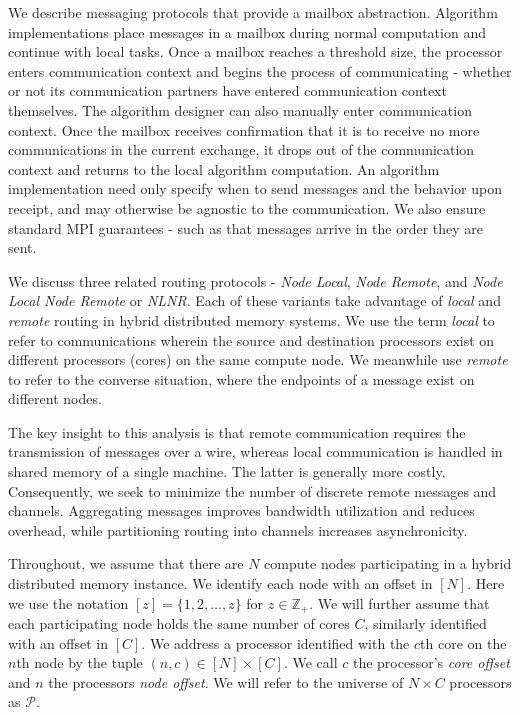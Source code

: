 \documentclass{report}
\begin{document}
We describe messaging protocols that provide a mailbox abstraction.
Algorithm implementations place messages in a mailbox during normal computation and continue with local tasks. 
Once a mailbox reaches a threshold size, the processor enters communication context and begins the process of communicating - whether or not its communication partners have entered communication context themselves. 
The algorithm designer can also manually enter communication context.
Once the mailbox receives confirmation that it is to receive no more communications in the current exchange, it drops out of the communication context and returns to the local algorithm computation.
An algorithm implementation need only specify when to send messages and the behavior upon receipt, and may otherwise be agnostic to the communication.
We also ensure standard MPI guarantees - such as that messages arrive in the order they are sent. 

We discuss three related routing protocols - \emph{Node Local}, \emph{Node Remote}, and \emph{Node Local Node Remote} or \emph{NLNR}.
Each of these variants take advantage of \emph{local} and \emph{remote} routing in hybrid distributed memory systems. 
We use the term \emph{local} to refer to communications wherein the source and destination processors exist on different processors (cores) on the same compute node.
We meanwhile use \emph{remote} to refer to the converse situation, where the endpoints of a message exist on different nodes. 

The key insight to this analysis is that remote communication requires the transmission of messages over a wire, whereas local communication is handled in shared memory of a single machine. 
The latter is generally more costly.
Consequently, we seek to minimize the number of discrete remote messages and channels.
Aggregating messages improves bandwidth utilization and reduces overhead, while  partitioning routing into channels increases asynchronicity. 

Throughout, we assume that there are $N$ compute nodes participating in a hybrid distributed memory instance.
We identify each node with an offset in $[N]$.
Here we use the notation $[z] = \{1, 2, \dots, z\}$ for $z \in \mathbb{Z}_+$.
We will further assume that each participating node holds the same number of cores $C$, similarly identified with an offset in $[C]$. 
We address a processor identified with the $c$th core on the $n$th node by the tuple $(n,c) \in [N] \times [C]$.
We call $c$ the processor's \emph{core offset} and $n$ the processors \emph{node offset}.
We will refer to the universe of $N \times C$ processors as $\mathcal{P}$.
\end{document}
